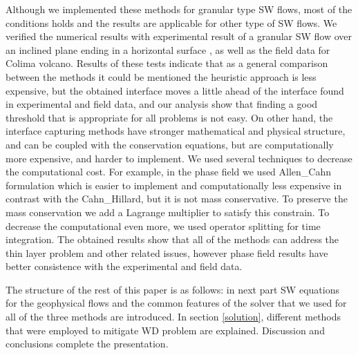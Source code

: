 \documentclass[letterpaper,10pt]{article}
\begin{document}
  Although we implemented these methods for granular type SW flows, most of the conditions holds and the results are applicable for other type of SW flows.  We verified the numerical results with 
  experimental result of a granular SW flow over an inclined plane ending in a horizontal surface , as well as the field data for Colima volcano.
Results of  these tests  indicate that
as a general comparison between the methods it could be mentioned the heuristic approach is less expensive, but the obtained interface moves a little ahead of the interface found in experimental and 
field data, and our analysis show that finding a good threshold that is appropriate for all problems is not easy. 
On other hand, the interface capturing methods have stronger mathematical and physical structure, and can be coupled with the conservation equations, but are computationally more expensive, and harder 
to implement. We used several techniques to decrease the computational cost. For example, in the phase field we used Allen\_Cahn formulation which is easier to implement and computationally less 
expensive in contrast with the Cahn\_Hillard, but it is not mass conservative. To preserve the mass conservation we add a Lagrange multiplier to satisfy this constrain. To decrease the computational 
even more, we used operator splitting for time integration. The obtained results show that all of the methods can address the thin layer problem and other related issues, however phase field results 
have better consistence with the experimental and field data. 

The structure of the rest of this paper is as follows: in next part SW equations for the geophysical flows and the common features of the solver that we used for all of the three methods are 
introduced. In section \ref{solution}, different methods that were employed to mitigate WD problem are explained. 
Discussion and conclusions complete the presentation.
\end{document}
